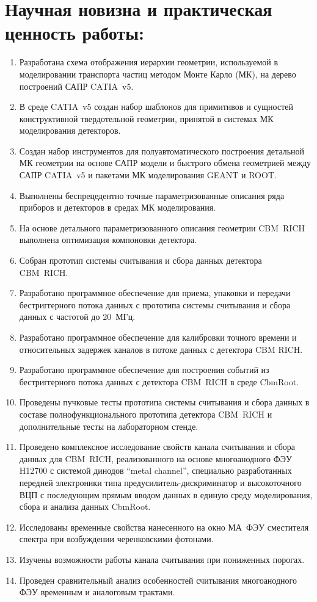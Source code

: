 \section*{Научная новизна и практическая ценность работы:}

\begin{enumerate}
\item Разработана схема отображения иерархии геометрии, используемой в моделировании транспорта частиц методом Монте Карло (МК), на дерево построений САПР CATIA~v5.
\item В среде CATIA~v5 создан набор шаблонов для примитивов и сущностей конструктивной твердотельной геометрии, принятой в системах МК моделирования детекторов.
\item Создан набор инструментов для полуавтоматического построения детальной МК геометрии на основе САПР модели и быстрого обмена геометрией между САПР CATIA~v5 и пакетами МК моделирования GEANT и ROOT.
\item Выполнены беспрецедентно точные параметризованные описания ряда приборов и детекторов в средах МК моделирования.
\item На основе детального параметризованного описания геометрии CBM~RICH выполнена оптимизация компоновки детектора. 
\item Собран прототип системы считывания и сбора данных детектора CBM~RICH.
\item Разработано программное обеспечение для приема, упаковки и передачи бестриггерного потока данных с прототипа системы считывания и сбора данных с частотой до 20~МГц.
\item Разработано программное обеспечение для калибровки точного времени и относительных задержек каналов в потоке данных с детектора CBM RICH.
\item Разработано программное обеспечение для построения событий из бестриггерного потока данных с детектора CBM~RICH в среде CbmRoot.
\item Проведены пучковые тесты прототипа системы считывания и сбора данных в составе полнофункционального прототипа детектора CBM~RICH и дополнительные тесты на лабораторном стенде. 
\item Проведено комплексное исследование свойств канала считывания и сбора данных для CBM~RICH, реализованного на основе многоанодного ФЭУ H12700 с системой динодов ``metal channel'', специально разработанных передней электроники типа предусилитель-дискриминатор и высокоточного ВЦП с последующим прямым вводом данных в единую среду моделирования, сбора и анализа данных CbmRoot.
\item Исследованы временные свойства нанесенного на окно МА~ФЭУ сместителя спектра при возбуждении черенковскими фотонами.
\item Изучены возможности работы канала считывания при пониженных порогах.
\item Проведен сравнительный анализ особенностей считывания многоанодного ФЭУ временным и аналоговым трактами.
\end{enumerate}
